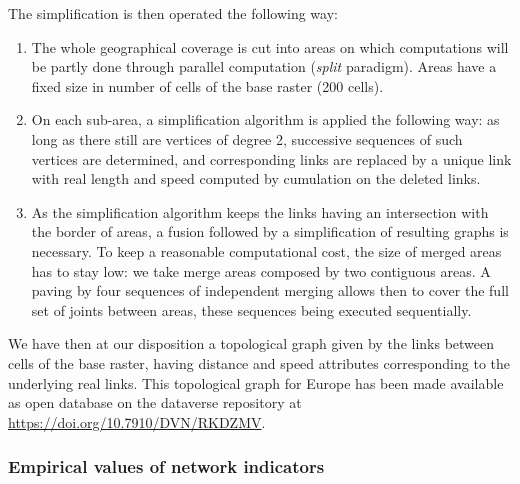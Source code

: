 The simplification is then operated the following way:
\begin{enumerate}
\item The whole geographical coverage is cut into areas on which computations will be partly done through parallel computation (\emph{split} paradigm). Areas have a fixed size in number of cells of the base raster (200 cells).
\item On each sub-area, a simplification algorithm is applied the following way: as long as there still are vertices of degree 2, successive sequences of such vertices are determined, and corresponding links are replaced by a unique link with real length and speed computed by cumulation on the deleted links.
\item As the simplification algorithm keeps the links having an intersection with the border of areas, a fusion followed by a simplification of resulting graphs is necessary. To keep a reasonable computational cost, the size of merged areas has to stay low: we take merge areas composed by two contiguous areas. A paving by four sequences of independent merging allows then to cover the full set of joints between areas, these sequences being executed sequentially.
\end{enumerate}



We have then at our disposition a topological graph given by the links between cells of the base raster, having distance and speed attributes corresponding to the underlying real links. This topological graph for Europe has been made available as  open database on the dataverse repository at \url{https://doi.org/10.7910/DVN/RKDZMV}.





\subsubsection{Empirical values of network indicators}



